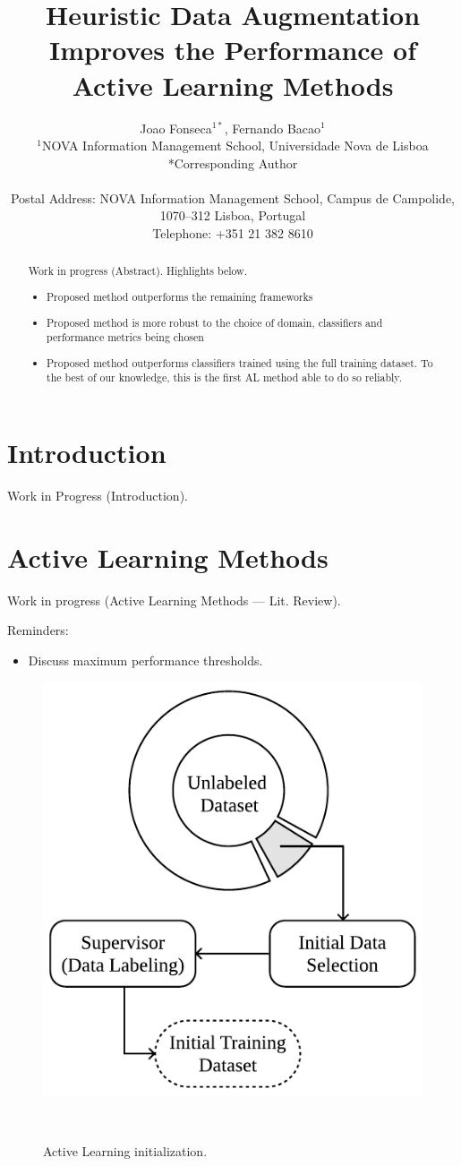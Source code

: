\documentclass[parskip=full]{scrartcl}
\date{}
\title{%
    Heuristic Data Augmentation Improves the Performance of Active Learning
    Methods
}
\author{%
	Joao Fonseca\(^{1*}\), Fernando Bacao\(^{1}\)
	\\
	\small{\(^{1}\)NOVA Information Management School, Universidade Nova de Lisboa}
	\\
	\small{*Corresponding Author}
	\\
	\\
	\small{Postal Address: NOVA Information Management School, Campus de
    Campolide, 1070--312 Lisboa, Portugal}
	\\
	\small{Telephone: +351 21 382 8610}
}
\begin{document}
\maketitle

\begin{abstract}
    Work in progress (Abstract). Highlights below.
    \begin{itemize}
        \item Proposed method outperforms the remaining frameworks
        \item Proposed method is more robust to the choice of domain, classifiers
            and performance metrics being chosen
        \item Proposed method outperforms classifiers trained using the full
            training dataset. To the best of our knowledge, this is the first
            AL method able to do so reliably.
    \end{itemize}
\end{abstract}

\section{Introduction}

Work in Progress (Introduction).

\section{Active Learning Methods}

Work in progress (Active Learning Methods --- Lit. Review).

Reminders:
\begin{itemize}
    \item Discuss maximum performance thresholds.
\end{itemize}

\begin{figure}[H]
	\centering
	\includegraphics[width=.4\linewidth]{../analysis/al_initialization}
    \caption{%
        Active Learning initialization.
    }~\label{fig:al_initialization}
\end{figure}
\end{document}
